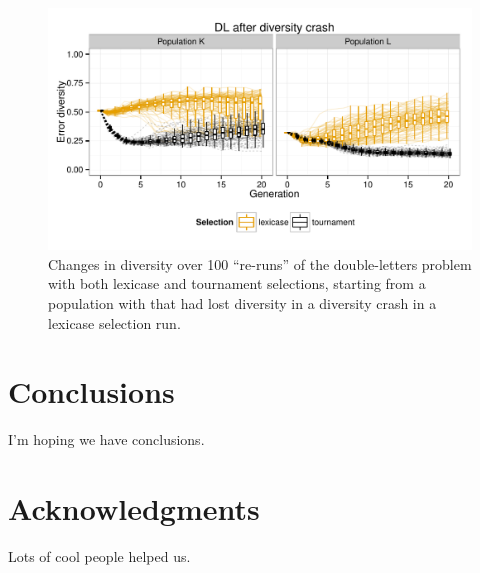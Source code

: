 \documentclass{sig-alternate-05-2015}
\begin{document}
\begin{figure}
	\includegraphics{../figures/DL_diversity_crash}
	\vspace{-1 cm}
	\caption{Changes in diversity over 100 ``re-runs'' of the double-letters problem with both lexicase and tournament selections, starting from a population with that had lost diversity in a diversity crash in a lexicase selection run.}
	\label{fig:DLdiversityCrash}
\end{figure}

\section{Conclusions}
\label{sec:conclusions}

I'm hoping we have conclusions.

\section*{Acknowledgments}
Lots of cool people helped us.


%
%


\end{document}
